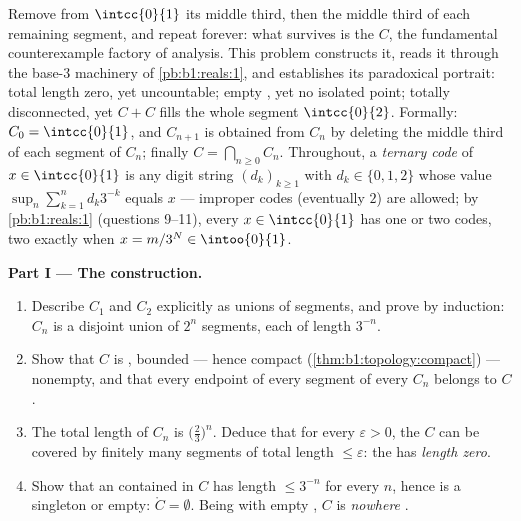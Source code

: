 \begin{problem}[{Weekend problem --- the Cantor middle-thirds
\omterm{def:b1:logic:sets}{set}: length zero, uncountable, perfect, and $C + C =
\intcc{0}{2}$}]
\label{pb:b1:topology:1}
Remove from $\intcc{0}{1}$ its  middle third, then the middle
third of each remaining segment, and repeat forever: what
survives is the \emph{} $C$, the fundamental
counterexample factory of analysis. This problem constructs it,
reads it through the base-$3$ machinery of \cref{pb:b1:reals:1},
and establishes its paradoxical portrait: total length zero, yet
uncountable; empty , yet no isolated point; totally
disconnected, yet $C + C$ fills the whole segment
$\intcc{0}{2}$. Formally: $C_0 = \intcc{0}{1}$,
and $C_{n+1}$ is obtained from $C_n$ by deleting the  middle
third of each segment of $C_n$; finally $C = \bigcap_{n \geq 0}
C_n$. Throughout, a \emph{ternary code} of $x \in \intcc{0}{1}$
is any digit string $(d_k)_{k\geq1}$ with $d_k \in \{0, 1, 2\}$
whose value $\sup_n \sum_{k=1}^n d_k 3^{-k}$ equals $x$ ---
improper codes (eventually $2$) are allowed; by
\cref{pb:b1:reals:1} (questions 9--11), every $x \in
\intcc{0}{1}$ has one or two codes, two exactly when $x = m/3^N
\in \intoo{0}{1}$.

\medskip
\noindent\textbf{Part I --- The construction.}
\begin{enumerate}
  \item Describe $C_1$ and $C_2$ explicitly as unions of
        segments, and prove by induction: $C_n$ is a disjoint
        union of $2^n$  segments, each of length $3^{-n}$.
  \item Show that $C$ is , bounded --- hence compact
        (\cref{thm:b1:topology:compact}) --- nonempty, and that
        every endpoint of every segment of every $C_n$ belongs
        to $C$.
  \item The total length of $C_n$ is $\bigl(\frac23\bigr)^n$.
        Deduce that for every $\varepsilon > 0$, the  $C$ can
        be covered by finitely many segments of total length
        $\leq \varepsilon$: the  has \emph{length
        zero}.
  \item Show that an  contained in $C$ has length $\leq
        3^{-n}$ for every $n$, hence is a singleton or empty:
        $\mathring C = \emptyset$. Being  with empty
        , $C$ is \emph{nowhere }.
\end{enumerate}


\end{problem}
